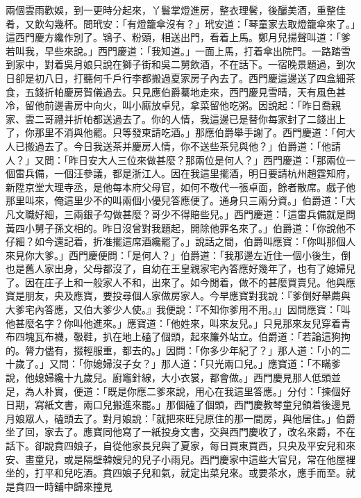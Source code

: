 兩個雲雨歡娛，到一更時分起來，丫鬟掌燈進房，整衣理鬢，後釃美酒，重整佳肴，又飲勾幾杯。問玳安：「有燈籠傘沒有？」玳安道：「琴童家去取燈籠傘來了。」這西門慶方纔作別了。鴇子、粉頭，相送出門，看着上馬。鄭月兒揚聲叫道：「爹若叫我，早些來說。」西門慶道：「我知道。」一面上馬，打着傘出院門。一路踏雪到家中，對着吳月娘只說在獅子街和吳二舅飲酒，不在話下。一宿晚景題過，到次日卻是初八日，打聽何千戶行李都搬過夏家房子內去了。西門慶這邊送了四盒細茶食，五錢折帕慶房賀儀過去。只見應伯爵驀地走來，西門慶見雪晴，天有風色甚冷，留他前邊書房中向火，叫小廝放卓兒，拿菜留他吃粥。因說起：「昨日喬親家、雲二哥禮并折帕都送過去了。你的人情，我這邊已是替你每家封了二錢出上了，你那里不消與他罷。只等發柬請吃酒。」那應伯爵舉手謝了。西門慶道：「何大人已搬過去了。今日我送茶并慶房人情，你不送些茶兒與他？」伯爵道：「他請人？」又問：「昨日安大人三位來做甚麼？那兩位是何人？」西門慶道：「那兩位一個雷兵備，一個汪參議，都是浙江人。因在我這里擺酒，明日要請杭州趙霆知府，新陞京堂大理寺丞，是他每本府父母官，如何不敬代一張卓面，餘者散席。戲子他那里叫來，俺這里少不的叫兩個小優兒答應便了。通身只三兩分資。」伯爵道：「大凡文職好細，三兩銀子勾做甚麼？哥少不得賠些兒。」西門慶道：「這雷兵備就是問黃四小舅子孫文相的。昨日沒曾對我題起，開除他罪名來了。」伯爵道：「你說他不仔細？如今還記着，折准擺這席酒纔罷了。」說話之間，伯爵叫應寶：「你叫那個人來見你大爹。」西門慶便問：「是何人？」伯爵道：「我那邊左近住一個小後生，倒也是舊人家出身，父母都沒了，自幼在王皇親家宅內答應好幾年了，也有了媳婦兒了。因在庄子上和一般家人不和，出來了。如今閒着，做不的甚麼買賣兒。他與應寶是朋友，央及應寶，要投尋個人家做房家人。今早應寶對我說：『爹倒好舉薦與大爹宅內答應，又伯大爹少人使。』我便說：『不知你爹用不用。』」因問應寶：「叫他甚麼名字？你叫他進來。」應寶道：「他姓來，叫來友兒。」只見那來友兒穿着青布四塊瓦布襪，靸鞋，扒在地上磕了個頭，起來簾外站立。伯爵道：「若論這狗拘的。膂力儘有，掇輕服重，都去的。」因問：「你多少年紀了？」那人道：「小的二十歲了。」又問：「你媳婦沒子女？」那人道：「只光兩口兒。」應寶道：「不瞞爹說，他媳婦纔十九歲兒。廚竈針線，大小衣裳，都會做。」西門慶見那人低頭並足，為人朴實，便道：「既是你應二爹來說，用心在我這里答應。」分付：「揀個好日期，寫紙文書，兩口兒搬進來罷。」那個磕了個頭，西門慶教琴童兒領着後邊見月娘眾人，磕頭去了。對月娘說：「就把來旺兒原住的那一間房，與他居住。」伯爵坐了回，家去了。應寶同他寫了一紙投身文書，交與西門慶收了，改名來爵，不在話下。卻說賁四娘子，自從他家長兒與了夏家，每日買東買西，只央及平安兒和來安、畫童兒，或是隔壁韓嫂兒的兒子小雨兒。西門慶家中這些大官兒，常在他屋裡坐的，打平和兒吃酒。賁四娘子兒和氣，就定出菜兒來。或要茶水，應手而至。就是賁四一時舖中歸來撞見 